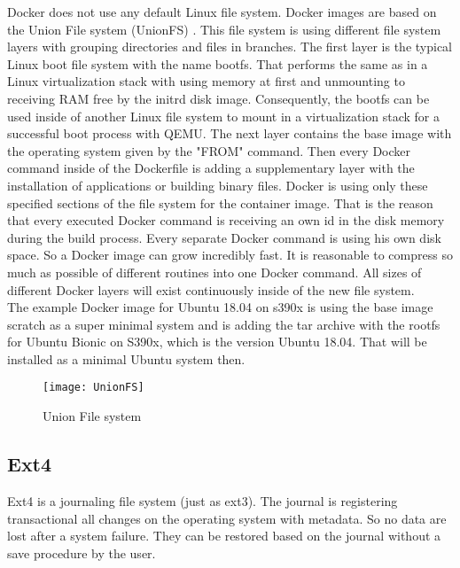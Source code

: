 Docker does not use any default Linux file system. 
Docker images are based on the Union File system (UnionFS) \cite[~p.21]{Ashraf2015}. 
This file system is using different file system layers with grouping directories and files in branches. 
The first layer is the typical Linux boot file system with the name bootfs. 
That performs the same as in a Linux virtualization stack with using memory at first and unmounting to receiving RAM free by the initrd disk image. 
Consequently, the bootfs can be used inside of another Linux file system to mount in a virtualization stack for a successful boot process with \gls{QEMU}.
The next layer contains the base image with the operating system given by the "FROM" command.
Then every Docker command inside of the Dockerfile is adding a supplementary layer with the installation of applications or building binary files. 
Docker is using only these specified sections of the file system for the container image.
That is the reason that every executed Docker command is receiving an own id in the disk memory during the build process.
Every separate Docker command is using his own disk space. So a Docker image can grow incredibly fast.
It is reasonable to compress so much as possible of different routines into one Docker command. 
All sizes of different Docker layers will exist continuously inside of the new file system. \\
The example Docker image for Ubuntu 18.04 on s390x is using the base image scratch as a super minimal system and is adding the tar archive with the rootfs for Ubuntu Bionic on S390x, which is the version Ubuntu 18.04. That will be installed as a minimal Ubuntu system then.

\begin{figure}[H]
\centering
\texttt{[image: UnionFS]}
 \caption{Union File system}
    \label{UnionFilesytem}
\end{figure}

\subsection{Ext4}

Ext4 is a journaling file system (just as ext3). The journal is registering transactional all changes on the operating system with metadata.
So no data  are lost after a system failure. They can be restored based on the journal without a save procedure by the user.

